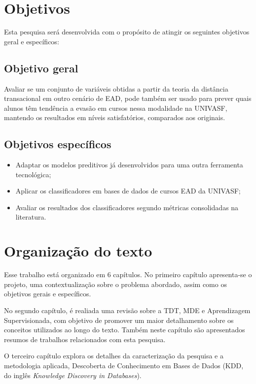 \section{Objetivos}

Esta pesquisa será desenvolvida com o propósito de atingir os seguintes
objetivos geral e específicos:

\subsection{Objetivo geral}

Avaliar se um conjunto de variáveis obtidas a partir da teoria da distância
transacional em outro cenário de EAD, pode também ser usado para prever quais
alunos têm tendência a evasão em cursos nessa modalidade na UNIVASF, mantendo os
resultados em níveis satisfatórios, comparados aos originais.

\subsection{Objetivos específicos}
\begin{itemize}
  \item Adaptar os modelos preditivos já desenvolvidos para uma outra ferramenta
  tecnológica;
  \item Aplicar os classificadores em bases de dados de cursos EAD da UNIVASF;
  \item Avaliar os resultados dos classificadores segundo métricas consolidadas
  na literatura.
\end{itemize}

\section{Organização do texto}

Esse trabalho está organizado em 6 capítulos. No primeiro capítulo apresenta-se
o projeto, uma contextualização sobre o problema abordado, assim como os
objetivos gerais e específicos.

No segundo capítulo, é realiada uma revisão sobre a TDT, MDE e Aprendizagem
Supervisionada, com objetivo de promover um maior detalhamento sobre os
conceitos utilizados ao longo do texto. Também neste capítulo são apresentados
resumos de trabalhos relacionados com esta pesquisa.

O terceiro capítulo explora os detalhes da caracterização da pesquisa e a
metodologia aplicada, Descoberta de Conhecimento em Bases de Dados (KDD, do
inglês \textit{Knowledge Discovery in Databases}).

